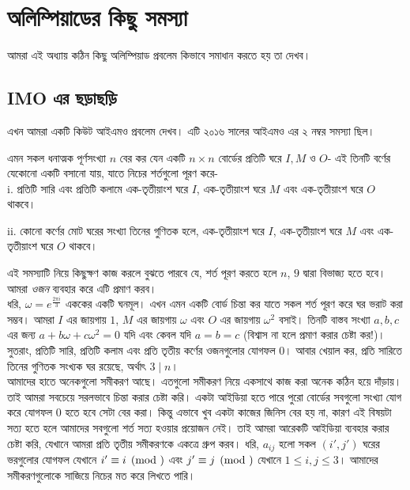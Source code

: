 \documentclass[11pt]{report}
\begin{document}
\chapter{অলিম্পিয়াডের কিছু সমস্যা}

আমরা এই অধ্যায় কঠিন কিছু অলিম্পিয়াড প্রবলেম কিভাবে সমাধান করতে হয় তা দেখব।

\section{IMO এর ছড়াছড়ি}

এখন আমরা একটি কিউট আইএমও প্রবলেম দেখব। এটি ২০১৬ সালের আইএমও এর ২ নম্বর সমস্যা ছিল।\\

\begin{tcolorbox}[colframe=black!80!green,title=IMO 2016]
এমন সকল ধনাত্মক পূর্ণসংখ্যা $n$ বের কর যেন একটি $n \times n$ বোর্ডের প্রতিটি ঘরে $I, M$ ও $O$- এই তিনটি বর্ণের যেকোনো একটি বসানো যায়, যাতে নিচের শর্তগুলো পূরণ করে-\\

i. প্রতিটি সারি এবং প্রতিটি কলামে এক-তৃতীয়াংশ ঘরে $I$, এক-তৃতীয়াংশ ঘরে $M$ এবং এক-তৃতীয়াংশ ঘরে $O$ থাকবে।

ii. কোনো কর্ণের মোট ঘরের সংখ্যা তিনের গুণিতক হলে, এক-তৃতীয়াংশ ঘরে $I$, এক-তৃতীয়াংশ ঘরে $M$ এবং এক-তৃতীয়াংশ ঘরে $O$ থাকবে।
\end{tcolorbox}

এই সমস্যাটি নিয়ে কিছুক্ষণ কাজ করলে বুঝতে পারবে যে, শর্ত পূরণ করতে হলে $n$, $9$ দ্বারা বিভাজ্য হতে হবে। আমরা \textit{ওজন} ব্যবহার করে এটি প্রমাণ করব।\\

ধরি, $\omega = e^{\frac{2\pi i}{3}}$ এককের একটি ঘনমূল। এখন এমন একটি বোর্ড চিন্তা কর যাতে সকল শর্ত পূরণ করে ঘর ভরাট করা সম্ভব। আমরা $I$ এর জায়গায় $1$, $M$ এর জায়গায় $\omega$ এবং $O$ এর জায়গায় $\omega^2$ বসাই। তিনটি বাস্তব সংখ্যা $a, b, c$ এর জন্য $a+b\omega+c\omega^2 = 0$ যদি এবং কেবল যদি $a=b=c$ (বিশ্বাস না হলে প্রমাণ করার চেষ্টা কর!)। সুতরাং, প্রতিটি সারি, প্রতিটি কলাম এবং প্রতি তৃতীয় কর্ণের ওজনগুলোর যোগফল $0$। আবার খেয়াল কর, প্রতি সারিতে তিনের গুণিতক সংখ্যক ঘর রয়েছে, অর্থাৎ $3 \mid n$।\\

আমাদের হাতে অনেকগুলো সমীকরণ আছে। এতগুলো সমীকরণ নিয়ে একসাথে কাজ করা অনেক কঠিন হয়ে দাঁড়ায়। তাই আমরা সবচেয়ে সরলভাবে চিন্তা করার চেষ্টা করি। একটা আইডিয়া হতে পারে পুরো বোর্ডের সবগুলো সংখ্যা যোগ করে যোগফল $0$ হতে হবে সেটা বের করা। কিন্তু এভাবে খুব একটা কাজের জিনিস বের হয় না, কারণ এই বিষয়টা সত্য হতে হলে আমাদের সবগুলো শর্ত সত্য হওয়ার প্রয়োজন নেই। তাই আমরা আরেকটি আইডিয়া ব্যবহার করার চেষ্টা করি, যেখানে আমরা প্রতি তৃতীয় সমীকরণকে একত্রে গ্রুপ করব। ধরি, $a_{ij}$ হলো সকল $(i', j')$ ঘরের ভরগুলোর যোগফল যেখানে $i' \equiv i \pmod$ এবং $j' \equiv j \pmod$ যেখানে $1 \leq i, j \leq 3$। আমাদের সমীকরণগুলোকে সাজিয়ে নিচের মত করে লিখতে পারি।\\
\end{document}

